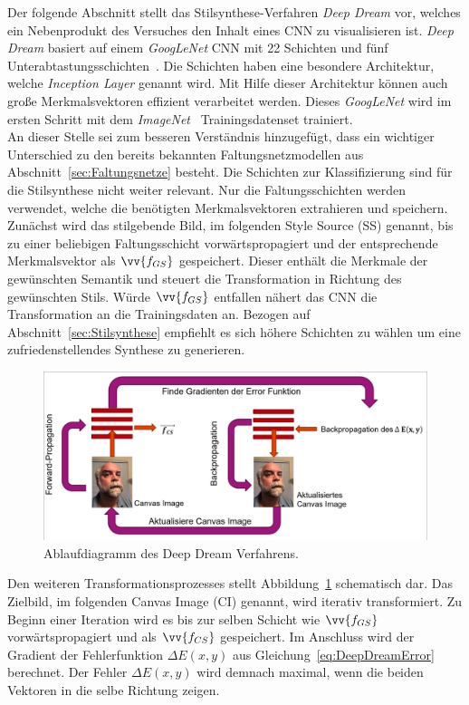 \documentclass[times, 11pt,twocolumn]{article}
\begin{document}
 \label{sec:DeepDream}
Der folgende Abschnitt stellt das Stilsynthese-Verfahren \textit{Deep Dream} \cite{DeepDream} vor, welches ein Nebenprodukt des Versuches den Inhalt eines CNN zu visualisieren ist. \textit{Deep Dream} basiert auf einem \textit{GoogLeNet} CNN mit 22 Schichten und fünf Unterabtastungsschichten~\cite{Szegedy_2015_CVPR}. Die Schichten haben eine besondere Architektur, welche \textit{Inception Layer} genannt wird. Mit Hilfe dieser Architektur können auch große Merkmalsvektoren effizient verarbeitet werden. Dieses \textit{GoogLeNet} wird im ersten Schritt mit dem \textit{\textit{ImageNet}}~\cite{ImageNet} Trainingsdatenset trainiert.\\
An dieser Stelle sei zum besseren Verständnis hinzugefügt, dass ein wichtiger Unterschied zu den bereits bekannten Faltungsnetzmodellen aus Abschnitt~\ref{sec:Faltungsnetze} besteht. Die Schichten zur Klassifizierung sind für die Stilsynthese nicht weiter relevant. Nur die Faltungsschichten werden verwendet, welche die benötigten Merkmalsvektoren extrahieren und speichern.\\
Zunächst wird das stilgebende Bild, im folgenden Style Source (SS) genannt, bis zu einer beliebigen Faltungsschicht vorwärtspropagiert und der entsprechende Merkmalsvektor als $\vv{f_{GS}}$ gespeichert. Dieser enthält die Merkmale der gewünschten Semantik und steuert die Transformation in Richtung des gewünschten Stils. Würde $\vv{f_{GS}}$ entfallen nähert das CNN die Transformation an die Trainingsdaten an.  Bezogen auf Abschnitt~\ref{sec:Stilsynthese} empfiehlt es sich höhere Schichten zu wählen um eine zufriedenstellendes Synthese zu generieren.\\
\begin{figure}
	\flushleft
	\includegraphics[width=\columnwidth]{Bilder/DeepDream.jpg}
	\caption{Ablaufdiagramm des Deep Dream Verfahrens.}
	\label{fig:DeepDream}
\end{figure}
Den weiteren Transformationsprozesses stellt Abbildung~\ref{fig:DeepDream} schematisch dar. Das Zielbild, im folgenden Canvas Image (CI) genannt, wird iterativ transformiert. Zu Beginn einer Iteration wird es bis zur selben Schicht wie $\vv{f_{GS}}$ vorwärtspropagiert und als $\vv{f_{CS}}$ gespeichert. Im Anschluss wird der Gradient der Fehlerfunktion $\Delta E(x,y)$ aus Gleichung~\ref{eq:DeepDreamError} berechnet. Der Fehler $\Delta E(x,y)$ wird demnach maximal, wenn die beiden Vektoren in die selbe Richtung zeigen.
\end{document}
